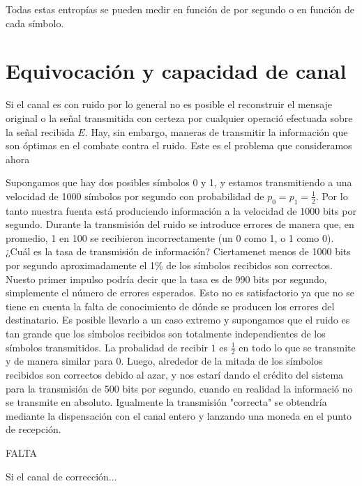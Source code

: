 Todas estas entrop\'{i}as se pueden medir en funci\'{o}n de por segundo o en funci\'{o}n de cada s\'{i}mbolo.

\clearpage

\chapter{Equivocaci\'{o}n y capacidad de canal}
\label{sec:12}

Si el canal es con ruido por lo general no es posible el reconstruir el mensaje original o la señal transmitida con certeza por cualquier operaci\'{o} efectuada sobre la señal recibida $E$. Hay, sin embargo, maneras de transmitir la informaci\'{o}n que son \'{o}ptimas en el combate contra el ruido. Este es el problema que consideramos ahora

Supongamos que hay dos posibles s\'{i}mbolos 0 y 1, y estamos transmitiendo a una velocidad de 1000 s\'{i}mbolos por segundo con probabilidad de $p_{0} = p_{1} = \frac{1}{2}$. Por lo tanto nuestra fuenta est\'{a} produciendo informaci\'{o}n a la velocidad de 1000 bits por segundo. Durante la transmisi\'{o}n del ruido se introduce errores de manera que, en promedio, 1 en 100 se recibieron incorrectamente (un 0 como 1, o 1 como 0). ¿Cu\'{a}l es la tasa de transmisi\'{o}n de informaci\'{o}n? Ciertamenet menos de 1000 bits por segundo aproximadamente el 1\% de los s\'{i}mbolos recibidos son correctos. Nuesto primer impulso podr\'{i}a decir que la tasa es de 990 bits por segundo, simplemente el n\'{u}mero de errores esperados. Esto no es satisfactorio ya que no se tiene en cuenta la falta de conocimiento de d\'{o}nde se producen los errores del destinatario. Es posible llevarlo a un caso extremo y supongamos que el ruido es tan grande que los s\'{i}mbolos recibidos son totalmente independientes de los s\'{i}mbolos transmitidos. La probalidad de recibir $1$ es $\frac{1}{2}$ en todo lo que se transmite y de manera similar para 0. Luego, alrededor de la mitada de los s\'{i}mbolos recibidos son correctos debido al azar, y nos estar\'{i} dando el cr\'{e}dito del sistema para la transmisi\'{o}n de 500 bits por segundo, cuando en realidad la informaci\'{o} no se transmite en absoluto. Igualmente la transmisi\'{o}n "correcta" se obtendr\'{i}a mediante la dispensaci\'{o}n con el canal entero y lanzando una moneda en el punto de recepci\'{o}n.

FALTA

\begin{theorem}
\label{th:10}
Si el canal de correcci\'{o}n...
\end{theorem}

